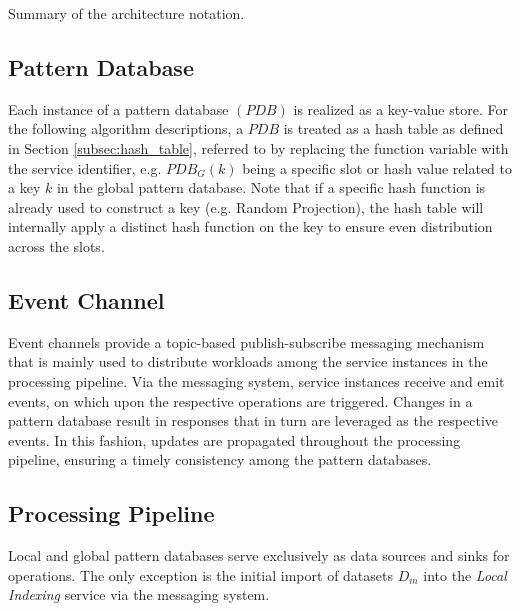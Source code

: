     \begin{table}[b]
        \centering
        
        \caption{Summary of the architecture notation.}
    \end{table}

\subsection{Pattern Database} \label{subsec:pattern_database}
Each instance of a pattern database $(PDB)$ is realized as a key-value store. For the following algorithm descriptions, a $PDB$ is treated as a hash table as defined in Section \ref{subsec:hash_table}, referred to by replacing the function variable with the service identifier, e.g. $PDB_G(k)$ being a specific slot or hash value related to a key $k$ in the global pattern database. Note that if a specific hash function is already used to construct a key (e.g. Random Projection), the hash table will internally apply a distinct hash function on the key to ensure even distribution across the slots. 

\subsection{Event Channel} \label{subsec:event_channel}
Event channels provide a topic-based publish-subscribe messaging mechanism that is mainly used to distribute workloads among the service instances in the processing pipeline. Via the messaging system, service instances receive and emit events, on which upon the respective operations are triggered. Changes in a pattern database result in responses that in turn are leveraged as the respective events. In this fashion, updates are propagated throughout the processing pipeline, ensuring a timely consistency among the pattern databases.

\subsection{Processing Pipeline} \label{subsec:processing_pipeline} 
Local and global pattern databases serve exclusively as data sources and sinks for operations. The only exception is the initial import of datasets $D_m$ into the \textit{Local Indexing} service via the messaging system.